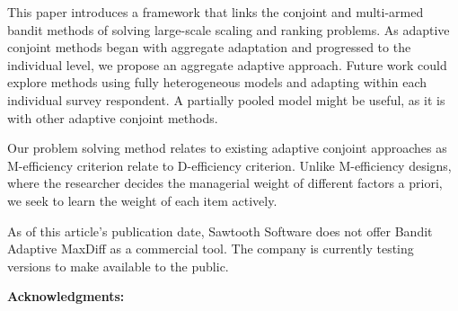 \documentclass[a4paper,11pt]{article}
\begin{document}
This paper introduces a framework that links the conjoint and multi-armed bandit methods of solving large-scale scaling and ranking problems. As adaptive conjoint methods began with aggregate adaptation and progressed to the individual level, we propose an aggregate adaptive approach. Future work could explore methods using fully heterogeneous models and adapting within each individual survey respondent. A partially pooled model might be useful, as it is with other adaptive conjoint methods. 

Our problem solving method relates to existing adaptive conjoint approaches as M-efficiency criterion relate to D-efficiency criterion.  Unlike M-efficiency designs, where the researcher decides the managerial weight of different factors a priori, we seek to learn the weight of each item actively. 

As of this article's publication date, Sawtooth Software does not offer Bandit Adaptive MaxDiff as a commercial tool. The company is currently testing versions to make available to the public.

\textbf{Acknowledgments:}
{%
}%


%
%
%


\end{document}
